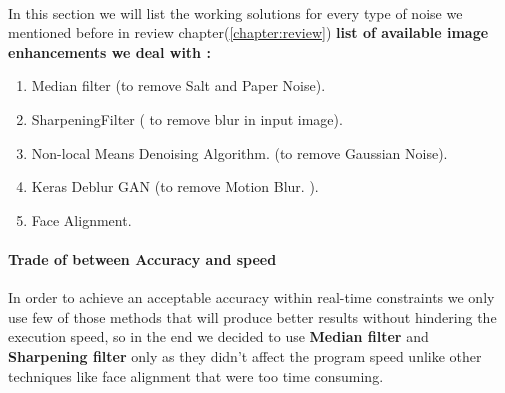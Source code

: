 \paragraph{}
In this section we will list the working solutions for every type of noise we mentioned before in review chapter(\ref{chapter:review})\newline
\textbf{list of available image enhancements  we deal with :}
\begin{enumerate}
	\item Median filter (to remove Salt and Paper Noise).
	\item SharpeningFilter ( to remove blur in input image).
	\item Non-local Means Denoising Algorithm. (to remove Gaussian Noise).
	\item Keras Deblur GAN (to remove Motion Blur. ).
	\item Face Alignment.
\end{enumerate}
\paragraph{Trade of between Accuracy and speed }
In order to achieve an acceptable accuracy within real-time constraints we only use few of those methods that will produce better results without hindering the execution speed, so in the end we decided to use \textbf{Median filter} and \textbf{Sharpening filter} only as they didn't affect the program speed unlike other techniques like face alignment that were too time consuming.